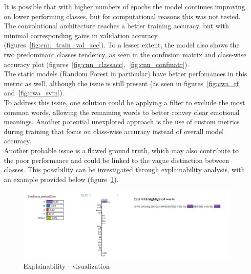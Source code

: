 It is possible that with higher numbers of epochs the model continues improving
on lower performing classes, but for computational reasons this was not tested.\\

The convolutional architecture reaches a better training accuracy, but with minimal
corresponding gains in validation accuracy
(figures~\ref{fig:cnn_train_val_acc}).
To a lesser extent, the model also shows the two predominant classes tendency,
as seen in the confusion matrix and class-wise accuracy plot
(figures~\ref{fig:cnn_classacc},~\ref{fig:cnn_confmatr}).\\

The static models (Random Forest in particular) have better perfomances in this metric as well,
although the issue is still present (as seen in
figures~\ref{fig:cwa_rf} and~\ref{fig:cwa_svm}).\\

To address this issue, one solution could be applying a filter to exclude the most
common words, allowing the remaining words to better convey clear emotional
meanings. Another potential unexplored approach is the use of custom
metrics during training that focus on class-wise accuracy instead of overall model
accuracy.\\

Another probable issue is a flawed ground truth, which may
also contribute to the poor performance and could be linked to the vague distinction
between classes.
This possibility can be investigated through explainability analysis, with an
example provided below (figure~\ref{fig:expl}).

\begin{figure}[H]
    \centering
    \includegraphics[scale= 0.55]{pictures/expl.png}
    \caption{Explainability - visualization}
    \label{fig:expl}
\end{figure}

